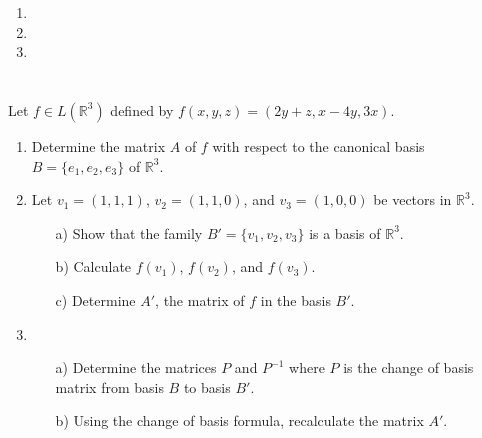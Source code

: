 \documentclass[12pt]{article}
\begin{document}
\begin{correctionbox}                                                                                                                                                                                                                    
 \begin{enumerate}                                                                                                          
     \item 
     \item 
     \item 
 \end{enumerate}                                                                                                            
\end{correctionbox}                                                                                                                                                                                                                      
                                                                                                                                                                                                                                         
\section{}                                                                                                                                                                                                                               
Let $f \in L(\mathbb{R}^3)$ defined by $f(x, y, z) = (2y + z, x - 4y, 3x)$.
\begin{enumerate}
    \item Determine the matrix $A$ of $f$ with respect to the canonical basis $B = \{e_1, e_2, e_3\}$ of $\mathbb{R}^3$.
    \item Let $v_1 = (1, 1, 1)$, $v_2 = (1, 1, 0)$, and $v_3 = (1, 0, 0)$ be vectors in $\mathbb{R}^3$.
    \begin{enumerate}
        \item[a)] Show that the family $B' = \{v_1, v_2, v_3\}$ is a basis of $\mathbb{R}^3$.
        \item[b)] Calculate $f(v_1)$, $f(v_2)$, and $f(v_3)$.
        \item[c)] Determine $A'$, the matrix of $f$ in the basis $B'$.
    \end{enumerate}
    \item \begin{enumerate}
        \item[a)] Determine the matrices $P$ and $P^{-1}$ where $P$ is the change of basis matrix from basis $B$ to basis $B'$.
        \item[b)] Using the change of basis formula, recalculate the matrix $A'$.
    \end{enumerate}
\end{enumerate}
\end{document}
